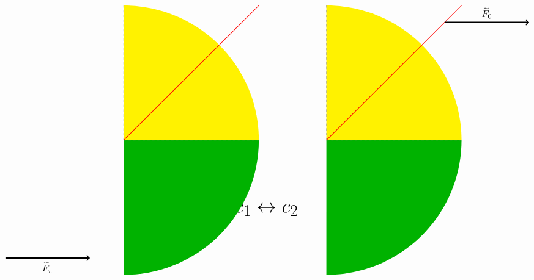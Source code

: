 \documentclass{article}
\begin{document}
\[
\begin{tikzpicture}[scale=1.5]
    \fill[yellow] (0,0) -- (0,4) arc (90:0:4) -- cycle;
    \fill[green!70!black] (0,0) -- (4,0) arc (0:-90:4) -- cycle;
    
    \draw[thick,red] (0,0) -- (4,4);
    \draw[dashed,gray] (0,0) -- (0,4);
    \draw[dashed,gray] (0,0) -- (4,0);
    
    \draw[->,ultra thick] (3.5,3.5) -- (6,3.5) node[midway,above,scale=1.2] {$\widetilde{F}_{0}$};

    \node at (-2,-2) {\Huge$\downarrow c_{1}\leftrightarrow c_{2}$};
    
    \begin{scope}[xshift=-6cm]
        \fill[yellow] (0,0) -- (0,4) arc (90:0:4) -- cycle;
        \fill[green!70!black] (0,0) -- (4,0) arc (0:-90:4) -- cycle;
        
        \draw[thick,red] (0,0) -- (4,4);
        \draw[dashed,gray] (0,0) -- (0,4);
        \draw[dashed,gray] (0,0) -- (4,0);
        
        \draw[->,ultra thick] (-3.5,-3.5) -- (-1,-3.5) node[midway,below,scale=1.2] {$\widetilde{F}_{\pi}$};
    \end{scope}
\end{tikzpicture}
\]
\end{document}
